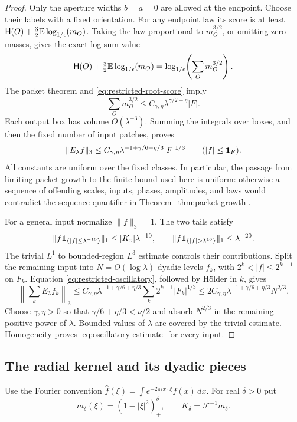 \begin{proof}
Only the aperture widths $b=a=0$ are allowed at the endpoint.  Choose
their labels with a fixed orientation.  For any endpoint law its score
is at least $\mathsf H(O)+\tfrac32\mathbb E\log_{1/\epsilon}\!\left(m_O\right)$.  Taking the law
proportional to $m_O^{3/2}$, or omitting zero masses, gives the exact
log-sum value
\[
 \mathsf H(O)+\tfrac32\mathbb E\log_{1/\epsilon}\!\left(m_O\right)
 =\log_{1/\epsilon}\!\left(\sum_Om_O^{3/2}\right).
\]
The packet theorem and \eqref{eq:restricted-root-score} imply
\begin{equation}\label{eq:endpoint-packet-sum}
 \sum_Om_O^{3/2}\le C_{\gamma,\eta}
 \lambda^{\gamma/2+\eta}|F|.
\end{equation}
Each output box has volume $O(\lambda^{-3})$.  Summing the integrals
over boxes, and then the fixed number of input patches, proves
\begin{equation}\label{eq:restricted-oscillatory}
 \|E_\lambda f\|_3
 \le C_{\gamma,\eta}\lambda^{-1+\gamma/6+\eta/3}|F|^{1/3}
 \qquad (|f|\le\mathbf 1_F).
\end{equation}
All constants are uniform over the fixed classes.  In particular, the
passage from limiting packet growth to the finite bound used here is
uniform: otherwise a sequence of offending scales, inputs, phases,
amplitudes, and laws would contradict the sequence quantifier in
Theorem~\ref{thm:packet-growth}.

For a general input normalize $\|f\|_3=1$.  The two tails satisfy
\[
 \|f\ind_{\{|f|\le\lambda^{-10}\}}\|_1
 \le |K_v|\lambda^{-10},\qquad
 \|f\ind_{\{|f|>\lambda^{10}\}}\|_1\le\lambda^{-20}.
\]
The trivial $L^1$ to bounded-region $L^3$ estimate controls their
contributions.  Split the remaining input into $N=O(\log\lambda)$
dyadic levels $f_k$, with $2^k<|f|\le2^{k+1}$ on $F_k$.  Equation
\eqref{eq:restricted-oscillatory}, followed by H\"older in $k$, gives
\[
 \left\|\sum_k E_\lambda f_k\right\|_3
 \le C_{\gamma,\eta}\lambda^{-1+\gamma/6+\eta/3}
 \sum_k2^{k+1}|F_k|^{1/3}
 \le 2C_{\gamma,\eta}\lambda^{-1+\gamma/6+\eta/3}N^{2/3}.
\]
Choose $\gamma,\eta>0$ so that $\gamma/6+\eta/3<\nu/2$ and absorb
$N^{2/3}$ in the remaining positive power of $\lambda$.  Bounded values
of $\lambda$ are covered by the trivial estimate.  Homogeneity proves
\eqref{eq:oscillatory-estimate} for every input.
\end{proof}

\subsection{The radial kernel and its dyadic pieces}

Use the Fourier convention
$\widehat f(\xi)=\int e^{-2\pi i x\cdot\xi}f(x)\,dx$.  For real
$\delta>0$ put
\[
 m_\delta(\xi)=(1-|\xi|^2)_+^\delta,
 \qquad K_\delta=\mathcal F^{-1}m_\delta.
\]


